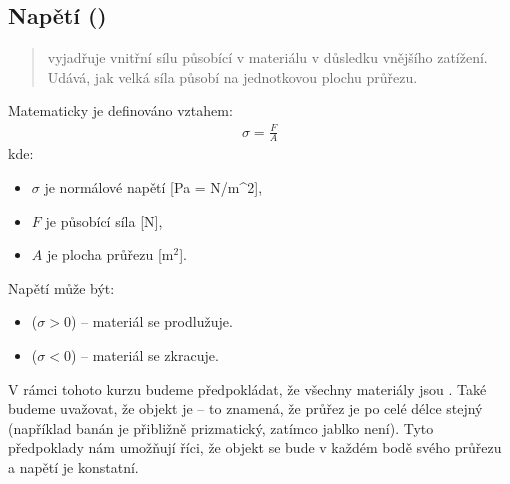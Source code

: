 \documentclass[letterpaper,10pt,english]{jupyterBook}
\let\sphinxpxdimen\pdfpxdimen\else\newdimen\sphinxpxdimen
\begin{document}
\subsection{Napětí ()}
\label{\detokenize{Prednasky/2_2_Hooke_u016fv_z_xe1kon:napeti-stress}}\begin{quote}

\sphinxAtStartPar
{} vyjadřuje vnitřní sílu působící v materiálu v důsledku vnějšího zatížení. Udává, jak velká síla působí na jednotkovou plochu průřezu.
\end{quote}

\sphinxAtStartPar
Matematicky je definováno vztahem:
\begin{equation*}
\begin{split} \sigma = \frac{F}{A}\end{split}
\end{equation*}
\sphinxAtStartPar
kde:
\begin{itemize}
\item {} 
\sphinxAtStartPar
\(\sigma\) je normálové napětí {[}Pa = N/m\textasciicircum{}2{]},

\item {} 
\sphinxAtStartPar
\(F\) je působící síla {[}N{]},

\item {} 
\sphinxAtStartPar
\(A\) je plocha průřezu {[}m\(^2\){]}.

\end{itemize}

\sphinxAtStartPar
Napětí může být:
\begin{itemize}
\item {} 
\sphinxAtStartPar
{} (\(\sigma > 0\)) – materiál se prodlužuje.

\item {} 
\sphinxAtStartPar
{} (\(\sigma < 0\)) – materiál se zkracuje.

\end{itemize}

\noindent\sphinxincludegraphics[width=500\sphinxpxdimen]{{normalstress}.jpg}

\sphinxAtStartPar
V rámci tohoto kurzu budeme předpokládat, že všechny materiály jsou . Také budeme uvažovat, že objekt je  – to znamená, že průřez je po celé délce stejný (například banán je přibližně prizmatický, zatímco jablko není). Tyto předpoklady nám umožňují říci, že objekt se bude  v každém bodě svého průřezu a napětí je konstatní.
\end{document}
